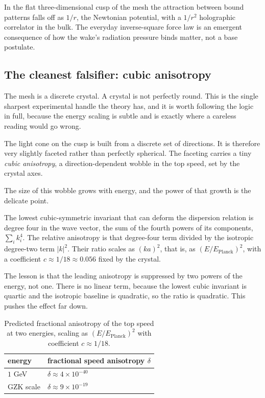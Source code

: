 \begin{result}
In the flat three-dimensional cusp of the mesh the attraction between bound patterns falls off as $1/r$, the Newtonian potential, with a $1/r^2$ holographic correlator in the bulk. The everyday inverse-square force law is an emergent consequence of how the wake's radiation pressure binds matter, not a base postulate.
\end{result}

\subsection{The cleanest falsifier: cubic anisotropy}

The mesh is a discrete crystal. A crystal is not perfectly round. This is the single sharpest experimental handle the theory has, and it is worth following the logic in full, because the energy scaling is subtle and is exactly where a careless reading would go wrong.

The light cone on the cusp is built from a discrete set of directions. It is therefore very slightly faceted rather than perfectly spherical. The faceting carries a tiny \emph{cubic anisotropy}, a direction-dependent wobble in the top speed, set by the crystal axes.

The size of this wobble grows with energy, and the power of that growth is the delicate point.

\begin{proposition}
The lowest cubic-symmetric invariant that can deform the dispersion relation is degree four in the wave vector, the sum of the fourth powers of its components, $\sum_i k_i^4$. The relative anisotropy is that degree-four term divided by the isotropic degree-two term $|k|^2$. Their ratio scales as $(k a)^2$, that is, as $(E/E_{\mathrm{Planck}})^2$, with a coefficient $c \approx 1/18 \approx 0.056$ fixed by the crystal.
\end{proposition}

The lesson is that the leading anisotropy is suppressed by two powers of the energy, not one. There is no linear term, because the lowest cubic invariant is quartic and the isotropic baseline is quadratic, so the ratio is quadratic. This pushes the effect far down.

\begin{table}[ht]
\centering
\begin{tabular}{@{}ll@{}}
\toprule
energy & fractional speed anisotropy $\delta$ \\
\midrule
$1$ GeV & $\delta \approx 4 \times 10^{-40}$ \\
GZK scale & $\delta \approx 9 \times 10^{-19}$ \\
\bottomrule
\end{tabular}
\caption{Predicted fractional anisotropy of the top speed at two energies, scaling as $(E/E_{\mathrm{Planck}})^2$ with coefficient $c \approx 1/18$.}
\label{tab:anisotropy}
\end{table}

